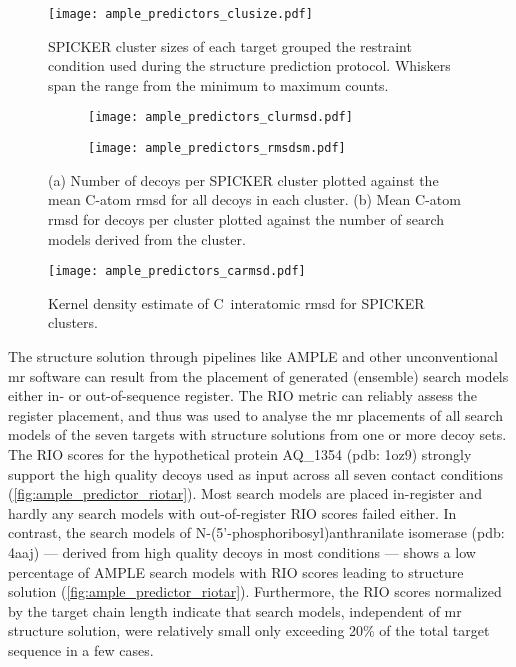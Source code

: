 \begin{figure}[H]
    \centering
    \texttt{[image: ample\_predictors\_clusize.pdf]}
    \caption[SPICKER cluster sizes grouped by restraint condition]{SPICKER cluster sizes of each target grouped the restraint condition used during the structure prediction protocol. Whiskers span the range from the minimum to maximum counts.}
    \label{fig:ample_predictor_clusize}
\end{figure}

\begin{figure}[H]
    \centering
    \begin{subfigure}[b]{\textwidth}
        \texttt{[image: ample\_predictors\_clurmsd.pdf]}
        \caption{}
        \label{fig:ample_predictor_clurmsd}
    \end{subfigure}
    \begin{subfigure}[b]{\textwidth}
        \texttt{[image: ample\_predictors\_rmsdsm.pdf]}
        \caption{}
        \label{fig:ample_predictor_rmsdsm}
    \end{subfigure}

    \caption[]{(a) Number of decoys per SPICKER cluster plotted against the mean C\textalpha-atom \gls{rmsd} for all decoys in each cluster. (b) Mean C\textalpha-atom \gls{rmsd} for decoys per cluster plotted against the number of search models derived from the cluster.}
\end{figure}

\begin{figure}[H]
    \centering
    \texttt{[image: ample\_predictors\_carmsd.pdf]}
    \caption[]{Kernel density estimate of C\textalpha\ interatomic \gls{rmsd} for SPICKER clusters.}
    \label{fig:ample_predictor_carmsd}
\end{figure}

The structure solution through pipelines like AMPLE and other unconventional \gls{mr} software \cite{Rodriguez2012-ad,Sammito2013-ug} can result from the placement of generated (ensemble) search models either in- or out-of-sequence register. The RIO metric \cite{Thomas2015-wu} can reliably assess the register placement, and thus was used to analyse the \gls{mr} placements of all search models of the seven targets with structure solutions from one or more decoy sets. The RIO scores for the hypothetical protein AQ\_1354 (\gls{pdb}: 1oz9) strongly support the high quality decoys used as input across all seven contact conditions (\cref{fig:ample_predictor_riotar}). Most search models are placed in-register and hardly any search models with out-of-register RIO scores failed either. In contrast, the search models of N-(5’-phosphoribosyl)anthranilate isomerase (\gls{pdb}: 4aaj) --- derived from high quality decoys in most conditions --- shows a low percentage of AMPLE search models with RIO scores leading to structure solution (\cref{fig:ample_predictor_riotar}). Furthermore, the RIO scores normalized by the target chain length indicate that search models, independent of \gls{mr} structure solution, were relatively small only exceeding 20\% of the total target sequence in a few cases. 


